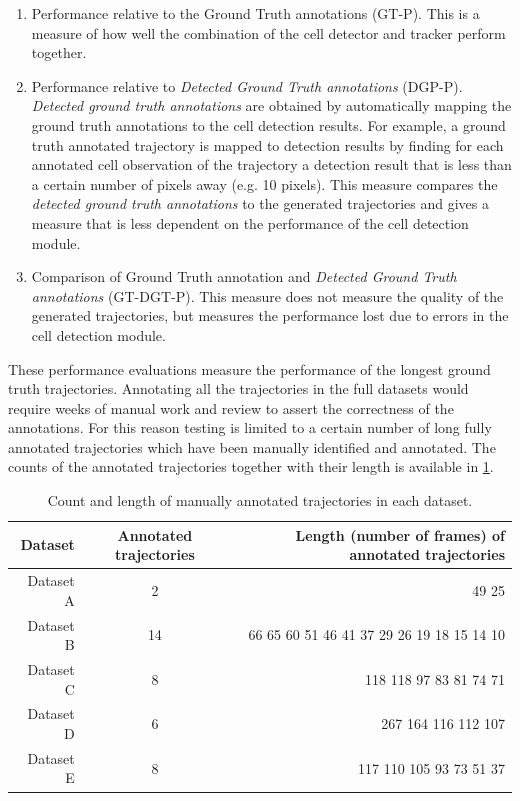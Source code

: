 	\begin{enumerate}
	\item Performance relative to the Ground Truth annotations (GT-P). This is a measure of how well the combination of the cell detector and tracker perform together.
	\item Performance relative to \textit{Detected Ground Truth annotations} (DGP-P). \textit{Detected ground truth annotations} are obtained by automatically mapping the ground truth annotations to the cell detection results. For example, a ground truth annotated trajectory is mapped to detection results by finding for each annotated cell observation of the trajectory a detection result that is less than a certain number of pixels away (e.g. 10 pixels). This measure compares the \textit{detected ground truth annotations} to the generated trajectories and gives a measure that is less dependent on the performance of the cell detection module.
	\item Comparison of Ground Truth annotation and \textit{Detected Ground Truth annotations} (GT-DGT-P). This measure does not measure the quality of the generated trajectories, but measures the performance lost due to errors in the cell detection module. 
	\end{enumerate}
	
	These performance evaluations measure the performance of the longest ground truth trajectories. Annotating all the trajectories in the full datasets would require weeks of manual work and review to assert the correctness of the annotations. For this reason testing is limited to a certain number of long fully annotated trajectories which have been manually identified and annotated. The counts of the annotated trajectories together with their length is available in \cref{tab:results_counttrajectories}.
	
	\begin{table}[h]
		\centering
		\begin{tabular}{rcr}
			  Dataset & Annotated trajectories &                              Length (number of frames) of annotated trajectories \\
		\hline
			Dataset A &           2            &                                                                         49    25 \\
			Dataset B &           14           & 66    65    60    51    46    41    37    29    26    19    18    15    14    10 \\
			Dataset C &           8            &                                          118   118    97    83    81    74    71 \\
			Dataset D &           6            &                                                      267   164   116   112   107 \\
			Dataset E &           8            &                                          117   110   105    93    73    51    37
		\end{tabular} 
		\caption{Count and length of manually annotated trajectories in each dataset.}
		\label{tab:results_counttrajectories}
	\end{table}

